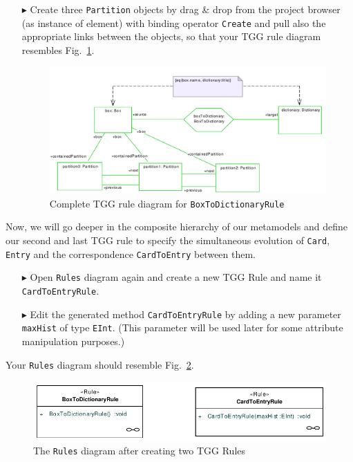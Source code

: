 \begin{enumerate}
\item[$\blacktriangleright$] Create three \texttt{Partition} objects by drag \& drop from the project browser (as instance of element) with binding operator \texttt{Create} and pull also the appropriate links between the objects, so that your TGG rule diagram resembles Fig.~\ref{fig:boxtodictionaryrule_complete}.

\begin{figure}[htbp]
\begin{center}
  \includegraphics[width=\textwidth]{pics/tggBilder/tggRule/tgg15}
  \caption{Complete TGG rule diagram for \texttt{BoxToDictionaryRule}}  
  \label{fig:boxtodictionaryrule_complete}
\end{center}
\end{figure}

\end{enumerate}

Now, we will go deeper in the composite hierarchy of our metamodels and define our second and last TGG rule to specify the simultaneous evolution of \texttt{Card}, \texttt{Entry} and the correspondence \texttt{CardToEntry} between them.

\begin{enumerate}
\item[$\blacktriangleright$] Open \texttt{Rules} diagram again and create a new TGG Rule and name it \texttt{CardToEntryRule}.
\item[$\blacktriangleright$] Edit the generated method \texttt{CardToEntryRule} by adding a new parameter \texttt{maxHist} of type \texttt{EInt}. 
(This parameter will be used later for some attribute manipulation purposes.)
\end{enumerate}

Your \texttt{Rules} diagram should resemble Fig.~\ref{fig:rules_diagram}.

\begin{figure}[htbp]
\begin{center}
  \includegraphics[width=\textwidth]{pics/tggBilder/tggRule/tgg16}
  \caption{The \texttt{Rules} diagram after creating two TGG Rules}  
  \label{fig:rules_diagram}
\end{center}
\end{figure}

